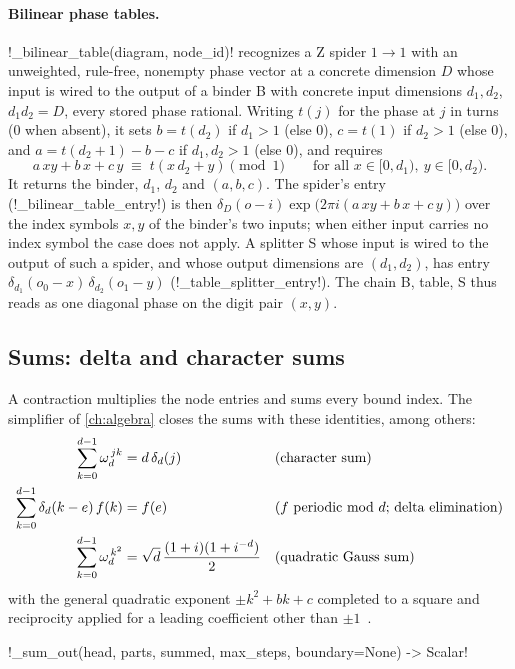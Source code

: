 \paragraph{Bilinear phase tables.} \py!_bilinear_table(diagram, node_id)! recognizes a Z spider $1\to1$ with an unweighted, rule-free, nonempty phase vector at a concrete dimension $D$ whose input is wired to the output of a binder B with concrete input dimensions $d_1,d_2$, $d_1d_2=D$, every stored phase rational. Writing $t(j)$ for the phase at $j$ in turns (0 when absent), it sets $b=t(d_2)$ if $d_1>1$ (else 0), $c=t(1)$ if $d_2>1$ (else 0), and $a=t(d_2+1)-b-c$ if $d_1,d_2>1$ (else 0), and requires
\[
a\,xy+b\,x+c\,y \;\equiv\; t(x\,d_2+y)\pmod 1\qquad\text{for all } x\in[0,d_1),\ y\in[0,d_2).
\]
It returns the binder, $d_1$, $d_2$ and $(a,b,c)$. The spider's entry (\py!_bilinear_table_entry!) is then $\delta_D(o-i)\exp\bigl(2\pi i(a\,xy+b\,x+c\,y)\bigr)$ over the index symbols $x,y$ of the binder's two inputs; when either input carries no index symbol the case does not apply. A splitter S whose input is wired to the output of such a spider, and whose output dimensions are $(d_1,d_2)$, has entry $\delta_{d_1}(o_0-x)\,\delta_{d_2}(o_1-y)$ (\py!_table_splitter_entry!). The chain B, table, S thus reads as one diagonal phase on the digit pair $(x,y)$.

\subsection{Sums: delta and character sums}\label{sec:semantics-symbolic-sums}

A contraction multiplies the node entries and sums every bound index. The simplifier of \cref{ch:algebra} closes the sums with these identities, among others:
\begin{align}
\sum_{k=0}^{d-1}\omega_d^{\,jk} &= d\,\delta_d(j) &&\text{(character sum)}\label{eq:semantics-character}\\
\sum_{k=0}^{d-1}\delta_d(k-e)\,f(k) &= f(e) &&\text{($f$ periodic mod $d$; delta elimination)}\notag\\
\sum_{k=0}^{d-1}\omega_d^{\,k^2} &= \sqrt d\,\frac{(1+i)(1+i^{-d})}{2} &&\text{(quadratic Gauss sum)}\label{eq:semantics-gauss}
\end{align}
with the general quadratic exponent $\pm k^2+bk+c$ completed to a square and reciprocity applied for a leading coefficient other than $\pm1$~\cite{berndt1998gauss,landsberg1893gauss}.

\begin{signature}
\py!_sum_out(head, parts, summed, max_steps, boundary=None) -> Scalar!
\end{signature}

